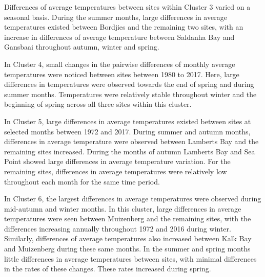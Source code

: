 \documentclass[12pt,A4paper,]{article}
\begin{document}
Differences of average temperatures between sites within Cluster 3
varied on a seasonal basis. During the summer months, large differences
in average temperatures existed between Bordjies and the remaining two
sites, with an increase in differences of average temperature between
Saldanha Bay and Gansbaai throughout autumn, winter and spring.

In Cluster 4, small changes in the pairwise differences of monthly
average temperatures were noticed between sites between 1980 to 2017.
Here, large differences in temperatures were observed towards the end of
spring and during summer months. Temperatures were relatively stable
throughout winter and the beginning of spring across all three sites
within this cluster.

In Cluster 5, large differences in average temperatures existed between
sites at selected months between 1972 and 2017. During summer and autumn
months, differences in average temperature were observed between
Lamberts Bay and the remaining sites increased. During the months of
autumn Lamberts Bay and Sea Point showed large differences in average
temperature variation. For the remaining sites, differences in average
temperatures were relatively low throughout each month for the same time
period.

In Cluster 6, the largest differences in average temperatures were
observed during mid-autumn and winter months. In this cluster, large
differences in average temperatures were seen between Muizenberg and the
remaining sites, with the differences increasing annually throughout
1972 and 2016 during winter. Similarly, differences of average
temperatures also increased between Kalk Bay and Muizenberg during these
same months. In the summer and spring months little differences in
average temperatures between sites, with minimal differences in the
rates of these changes. These rates increased during spring.
\end{document}
